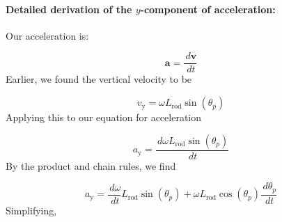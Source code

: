 \documentclass[12pt]{article}
\begin{document}
\paragraph{Detailed derivation of the $y$-component of acceleration:}
\label{GD:accelerationIYDeriv}
Our acceleration is:

\begin{displaymath}
\symbf{a}=\frac{\,d\symbf{v}}{\,dt}
\end{displaymath}
Earlier, we found the vertical velocity to be

\begin{displaymath}
{v_{\text{y}}}=ω {L_{\text{rod}}} \sin\left({θ_{p}}\right)
\end{displaymath}
Applying this to our equation for acceleration

\begin{displaymath}
{a_{\text{y}}}=\frac{\,dω {L_{\text{rod}}} \sin\left({θ_{p}}\right)}{\,dt}
\end{displaymath}
By the product and chain rules, we find

\begin{displaymath}
{a_{\text{y}}}=\frac{\,dω}{\,dt} {L_{\text{rod}}} \sin\left({θ_{p}}\right)+ω {L_{\text{rod}}} \cos\left({θ_{p}}\right) \frac{\,d{θ_{p}}}{\,dt}
\end{displaymath}
Simplifying,
\end{document}
